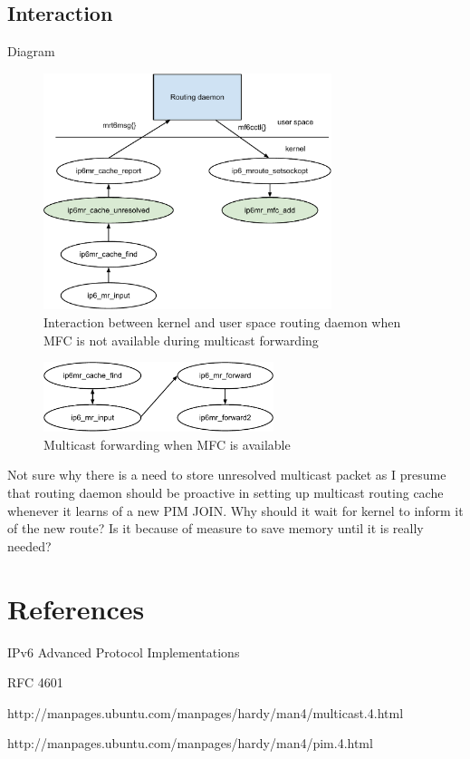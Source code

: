 \documentclass{article}
\begin{document}
\subsection{Interaction}
Diagram
\begin{figure}[!h]
  \begin{center}
    \includegraphics[width=0.75\textwidth]{mcast-unresolved}
    \caption{Interaction between kernel and user space routing daemon when MFC
    is not available during multicast forwarding}
    \label{fig:mcast-unresolved}
  \end{center}
\end{figure}

\begin{figure}[!h]
  \begin{center}
    \includegraphics[width=0.6\textwidth]{mcast-mfc}
    \caption{Multicast forwarding when MFC is available}
    \label{fig:mcast-mfc}
  \end{center}
\end{figure}


Not sure why there is a need to store unresolved multicast packet as I presume
that routing daemon should be proactive in setting up multicast routing cache
whenever it learns of a new PIM JOIN. Why should it wait for kernel to inform
it of the new route? Is it because of measure to save memory until it is really
needed?


\section{References}
IPv6 Advanced Protocol Implementations

RFC 4601

http://manpages.ubuntu.com/manpages/hardy/man4/multicast.4.html

http://manpages.ubuntu.com/manpages/hardy/man4/pim.4.html
\end{document}
